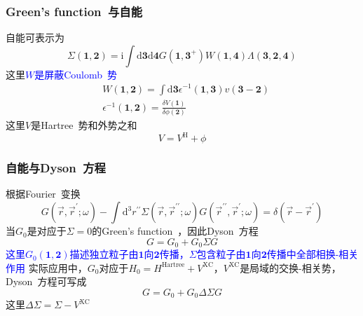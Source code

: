 \documentclass[cjk,slidestop,compress,mathserif,blue]{beamer}
\begin{document}
\frame
{
	\frametitle{\textrm{Green's function~}与自能}
	自能可表示为
	\begin{displaymath}
		\Sigma(\mathbf{1},\mathbf{2})=\mathrm{i}\int\mathrm{d}\mathbf{3}\mathrm{d}\mathbf{4}G(\mathbf{1},\mathbf{3}^{+})W(\mathbf{1},\mathbf{4})\Lambda(\mathbf{3},\mathbf{2},\mathbf{4})
	\end{displaymath}
	这里\textcolor{blue}{$W$是屏蔽\textrm{Coulomb~}势}
	\begin{displaymath}
		\begin{aligned}
			&W(\mathbf{1},\mathbf{2})=\int\mathrm{d}\mathbf{3}\epsilon^{-1}(\mathbf{1},\mathbf{3})v(\mathbf{3}-\mathbf{2})\\
			&\epsilon^{-1}(\mathbf{1},\mathbf{2})=\frac{\delta V(\mathbf{1})}{\delta\phi(\mathbf{2})}
		\end{aligned}
	\end{displaymath}
	这里$V$是\textrm{Hartree~}势和外势之和
	\begin{displaymath}
		V=V^{\mathrm H}+\phi
	\end{displaymath}
	\fontsize{8.5pt}{6.2pt}
}

\frame
{
	\frametitle{自能与\textrm{Dyson~}方程}
	根据\textrm{Fourier~}变换
	\begin{displaymath}
		[\omega-H_0(\vec r)]G(\vec r,\vec r^{\prime};\omega)-\int\mathrm{d}^3r^{\prime\prime}\Sigma(\vec r,\vec r^{\prime\prime};\omega)G(\vec r^{\prime\prime},\vec r^{\prime};\omega)=\delta(\vec r-\vec r^{\prime})
	\end{displaymath}
	当$G_0$是对应于$\Sigma=0$的\textrm{Green's function~}，因此\textrm{Dyson~}方程
	\begin{displaymath}
		G=G_0+G_0\Sigma G
	\end{displaymath}
	\textcolor{blue}{这里$G_0(\mathbf{1},\mathbf{2})$描述独立粒子由$\mathbf{1}$向$\mathbf{2}$传播，$\Sigma$包含粒子由$\mathbf{1}$向$\mathbf{2}$传播中全部相换-相关作用}
\vskip 5pt
实际应用中，$G_0$对应于$H_0=H^{\textrm{Hartree}}+V^{\mathrm{XC}}$，$V^{\mathrm{XC}}$是局域的交换-相关势，\textrm{Dyson~}方程可写成
\begin{displaymath}
	G=G_0+G_0\Delta\Sigma G
\end{displaymath}
这里$\Delta\Sigma=\Sigma-V^{\mathrm{XC}}$
}
\end{document}
